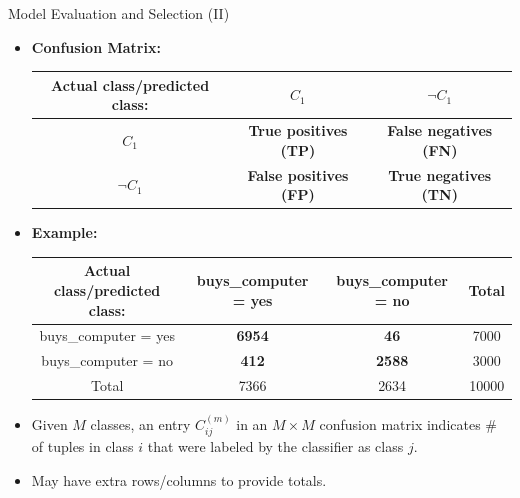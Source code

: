 \begin{frame}{Model Evaluation and Selection (II)}
  \begin{itemize}
  \item \textbf{Confusion Matrix:}\\[0.2cm]
    \begin{tabular}{|c|c|c|}
      \hline
      Actual class/predicted class: & $C_1$ & $\neg C_1$ \\\hline
      $C_1$ & \textbf{True positives (TP)} & \textbf{False negatives (FN)} \\\hline
      $\neg C_1$ & \textbf{False positives (FP)} & \textbf{True negatives (TN)} \\\hline
    \end{tabular}
  \item \textbf{Example:}\\[0.2cm]
    \begin{tabular}{|c|c|c|c|}
      \hline
      Actual class/predicted class: & buys\_computer = yes & buys\_computer = no & Total \\\hline
      buys\_computer = yes & \textbf{6954} & \textbf{46} & 7000 \\\hline
      buys\_computer = no & \textbf{412} & \textbf{2588} & 3000 \\\hline
      Total & 7366 & 2634 & 10000 \\\hline
    \end{tabular}
  \item Given $M$ classes, an entry $C^{(m)}_{ij}$ in an $M \times M$ confusion matrix indicates \# of tuples in class $i$ that were labeled by the classifier as class $j$.
  \item May have extra rows/columns to provide totals.
  \end{itemize}
\end{frame}

